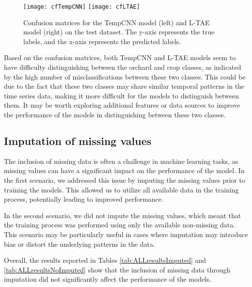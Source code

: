\begin{figure}[H]
  \centering
  \texttt{[image: cfTempCNN]}
  \texttt{[image: cfLTAE]}
  \caption{Confusion matrices for the TempCNN model (left) and L-TAE model (right) on the test dataset. The y-axis represents the true labels, and the x-axis represents the predicted labels.}
\end{figure}

Based on the confusion matrices, both TempCNN and L-TAE models seem to have difficulty distinguishing between the orchard and crop classes, as indicated by the high number of misclassifications between these two classes.
This could be due to the fact that these two classes may share similar temporal patterns in the time series data, making it more difficult for the models to distinguish between them. 
It may be worth exploring additional features or data sources to improve the performance of the models in distinguishing between these two classes.

\subsection{Imputation of missing values}

The inclusion of missing data is often a challenge in machine learning tasks, as missing values can have a significant impact on the performance of the model.
In the first scenario, we addressed this issue by imputing the missing values prior to training the models. 
This allowed us to utilize all available data in the training process, potentially leading to improved performance.

In the second scenario, we did not impute the missing values, which meant that the training process was performed using only the available non-missing data.
This scenario may be particularly useful in cases where imputation may introduce bias or distort the underlying patterns in the data.

Overall, the results reported in Tables \ref{tab:ALLresultsImputed} and \ref{tab:ALLresultsNoImputed} show that the inclusion of missing data through imputation did not significantly affect the performance of the models.